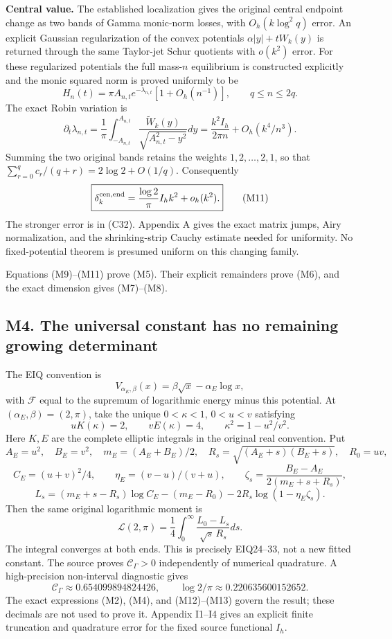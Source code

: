 \documentclass[
  11pt,
]{article}
\begin{document}
\textbf{Central value.} The established localization gives the original
central endpoint change as two bands of Gamma monic-norm losses, with
\(O_h(k\log^2q)\) error. An explicit Gaussian regularization of the
convex potentials \(\alpha|y|+tW_k(y)\) is returned through the same
Taylor-jet Schur quotients with \(o(k^2)\) error. For these regularized
potentials the full mass-\(n\) equilibrium is constructed explicitly and
the monic squared norm is proved uniformly to be \[
H_n(t)=\pi A_{n,t}e^{-\lambda_{n,t}}[1+O_h(n^{-1})],
\qquad q\le n\le2q.
\] The exact Robin variation is \[
\partial_t\lambda_{n,t}
=\frac1\pi\int_{-A_{n,t}}^{A_{n,t}}
\frac{\widetilde W_k(y)}{\sqrt{A_{n,t}^2-y^2}}dy
=\frac{k^2I_h}{2\pi n}+O_h(k^4/n^3).
\] Summing the two original bands retains the weights
\(1,2,\ldots,2,1\), so that \(\sum_{r=0}^q c_r/(q+r)=2\log2+O(1/q)\).
Consequently \[
\boxed{\delta_k^{\rm cen,end}
=\frac{\log2}{\pi}I_hk^2+o_h(k^2).}\tag{M11}
\] The stronger error is in (C32). Appendix A gives the exact matrix
jumps, Airy normalization, and the shrinking-strip Cauchy estimate
needed for uniformity. No fixed-potential theorem is presumed uniform on
this changing family.

Equations (M9)--(M11) prove (M5). Their explicit remainders prove (M6),
and the exact dimension gives (M7)--(M8).

\subsection{M4. The universal constant has no remaining growing
determinant}\label{m4.-the-universal-constant-has-no-remaining-growing-determinant}

The EIQ convention is \[
V_{\alpha_E,\beta}(x)=\beta\sqrt x-\alpha_E\log x,
\] with \(\mathcal F\) equal to the supremum of logarithmic energy minus
this potential. At \((\alpha_E,\beta)=(2,\pi)\), take the unique
\(0<\kappa<1\), \(0<u<v\) satisfying \[
uK(\kappa)=2,\qquad vE(\kappa)=4,\qquad
\kappa^2=1-u^2/v^2.
\tag{M12}
\] Here \(K,E\) are the complete elliptic integrals in the original real
convention. Put \[
A_E=u^2,\quad B_E=v^2,\quad m_E=(A_E+B_E)/2,\quad
R_s=\sqrt{(A_E+s)(B_E+s)},\quad R_0=uv,
\] \[
C_E=(u+v)^2/4,\qquad \eta_E=(v-u)/(v+u),\qquad
\zeta_s=\frac{B_E-A_E}{2(m_E+s+R_s)},
\] \[
L_s=(m_E+s-R_s)\log C_E-(m_E-R_0)
-2R_s\log(1-\eta_E\zeta_s).
\] Then the same original logarithmic moment is \[
\boxed{\mathcal L(2,\pi)=
\frac14\int_0^\infty\frac{L_0-L_s}{\sqrt s\,R_s}ds.}\tag{M13}
\] The integral converges at both ends. This is precisely EIQ24--33, not
a new fitted constant. The source proves \(\mathcal C_\Gamma>0\)
independently of numerical quadrature. A high-precision non-interval
diagnostic gives \[
\mathcal C_\Gamma\approx0.654099894824426,\qquad
\log2/\pi\approx0.220635600152652.
\] The exact expressions (M2), (M4), and (M12)--(M13) govern the result;
these decimals are not used to prove it. Appendix I1--I4 gives an
explicit finite truncation and quadrature error for the fixed source
functional \(I_h\).
\end{document}
